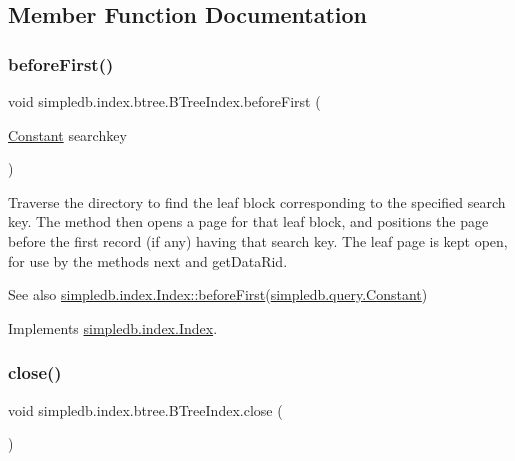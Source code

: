 \subsection{Member Function Documentation}
\mbox{\label{classsimpledb_1_1index_1_1btree_1_1BTreeIndex_adaca869455d2d631df38e7bc81de2420}} 
\subsubsection{\texorpdfstring{before\+First()}{beforeFirst()}}
{\footnotesize\ttfamily void simpledb.\+index.\+btree.\+B\+Tree\+Index.\+before\+First (\begin{DoxyParamCaption}\item[{\hyperlink{classsimpledb_1_1query_1_1Constant}{Constant}}]{searchkey }\end{DoxyParamCaption})\hspace{0.3cm}{\ttfamily [inline]}}

Traverse the directory to find the leaf block corresponding to the specified search key. The method then opens a page for that leaf block, and positions the page before the first record (if any) having that search key. The leaf page is kept open, for use by the methods next and get\+Data\+Rid. \begin{DoxySeeAlso}{See also}
\hyperlink{interfacesimpledb_1_1index_1_1Index_a393ce322b5a7ffee20d8ff85abef7444}{simpledb.\+index.\+Index\+::before\+First}(\hyperlink{classsimpledb_1_1query_1_1Constant}{simpledb.\+query.\+Constant}) 
\end{DoxySeeAlso}


Implements \hyperlink{interfacesimpledb_1_1index_1_1Index_a393ce322b5a7ffee20d8ff85abef7444}{simpledb.\+index.\+Index}.

\mbox{\label{classsimpledb_1_1index_1_1btree_1_1BTreeIndex_a057aed52a768423734720f07bf0db94b}} 
\subsubsection{\texorpdfstring{close()}{close()}}
{\footnotesize\ttfamily void simpledb.\+index.\+btree.\+B\+Tree\+Index.\+close (\begin{DoxyParamCaption}{ }\end{DoxyParamCaption})\hspace{0.3cm}{\ttfamily [inline]}}

